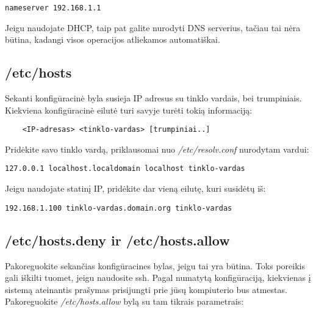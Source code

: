   \begin{verbatim}
nameserver 192.168.1.1
  \end{verbatim}

  Jeigu naudojate DHCP, taip pat galite nurodyti DNS serverius, tačiau
  tai nėra būtina, kadangi visos operacijos atliekamos automatiškai. 

\subsection{/etc/hosts}

  Sekanti konfigūracinė byla susieja IP adresus su tinklo vardais, bei
  trumpiniais. Kiekviena konfigūracinė eilutė turi savyje turėti tokią
  informaciją:

  \begin{verbatim}
    <IP-adresas> <tinklo-vardas> [trumpiniai..]
  \end{verbatim}

  Pridėkite savo tinklo vardą, priklausomai nuo
  \textsl{/etc/resolv.conf} nurodytam vardui:

  \begin{verbatim}
127.0.0.1 localhost.localdomain localhost tinklo-vardas
  \end{verbatim}

  Jeigu naudojate statinį IP, pridėkite dar vieną eilutę, kuri
  susidėtų iš:

  \begin{verbatim}
192.168.1.100 tinklo-vardas.domain.org tinklo-vardas
  \end{verbatim}

\subsection{/etc/hosts.deny ir /etc/hosts.allow}

  Pakoreguokite sekančias konfigūracines bylas, jeigu tai yra
  būtina. Toks poreikis gali iškilti tuomet, jeigu naudosite
  ssh. Pagal numatytą konfigūraciją, kiekvienas į sistemą ateinantis
  prašymas prisijungti prie jūsų kompiuterio bus
  atmestas. Pakoreguokite \textsl{/etc/hosts.allow} bylą su tam
  tikrais parametrais:

